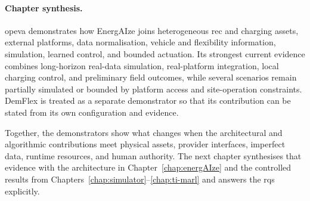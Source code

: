 \paragraph{Chapter synthesis.}
\gls{opeva} demonstrates how EnergAIze joins heterogeneous \gls{rec} and charging assets, external platforms, data normalisation, vehicle and flexibility information, simulation, learned control, and bounded actuation. Its strongest current evidence combines long-horizon real-data simulation, real-platform integration, local charging control, and preliminary field outcomes, while several scenarios remain partially simulated or bounded by platform access and site-operation constraints. DemFlex is treated as a separate demonstrator so that its contribution can be stated from its own configuration and evidence.

Together, the demonstrators show what changes when the architectural and algorithmic contributions meet physical assets, provider interfaces, imperfect data, runtime resources, and human authority. The next chapter synthesises that evidence with the architecture in Chapter~\ref{chap:energAIze} and the controlled results from Chapters~\ref{chap:simulator}--\ref{chap:ti-marl} and answers the \glspl{rq} explicitly.
